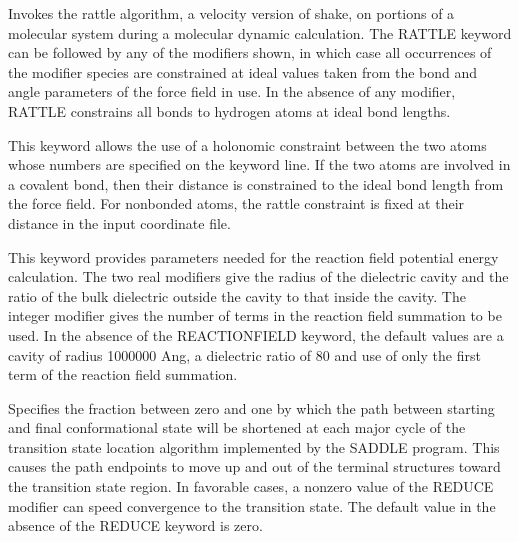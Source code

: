 \documentclass[letterpaper,11pt,english]{sphinxmanual}
\begin{document}
  Invokes the rattle algorithm, a velocity version of shake, on portions of a molecular system during a molecular dynamic calculation. The RATTLE keyword can be followed by any of the modifiers shown, in which case all occurrences of the modifier species are constrained at ideal values taken from the bond and angle parameters of the force field in use. In the absence of any modifier, RATTLE constrains all bonds to hydrogen atoms at ideal bond lengths.

  This keyword allows the use of a holonomic constraint between the two atoms whose numbers are specified on the keyword line. If the two atoms are involved in a covalent bond, then their distance is constrained to the ideal bond length from the force field. For nonbonded atoms, the rattle constraint is fixed at their distance in the input coordinate file.





  This keyword provides parameters needed for the reaction field potential energy calculation. The two real modifiers give the radius of the dielectric cavity and the ratio of the bulk dielectric outside the cavity to that inside the cavity. The integer modifier gives the number of terms in the reaction field summation to be used. In the absence of the REACTIONFIELD keyword, the default values are a cavity of radius 1000000 Ang, a dielectric ratio of 80 and use of only the first term of the reaction field summation.

  Specifies the fraction between zero and one by which the path between starting and final conformational state will be shortened at each major cycle of the transition state location algorithm implemented by the SADDLE program. This causes the path endpoints to move up and out of the terminal structures toward the transition state region. In favorable cases, a nonzero value of the REDUCE modifier can speed convergence to the transition state. The default value in the absence of the REDUCE keyword is zero.
\end{document}
